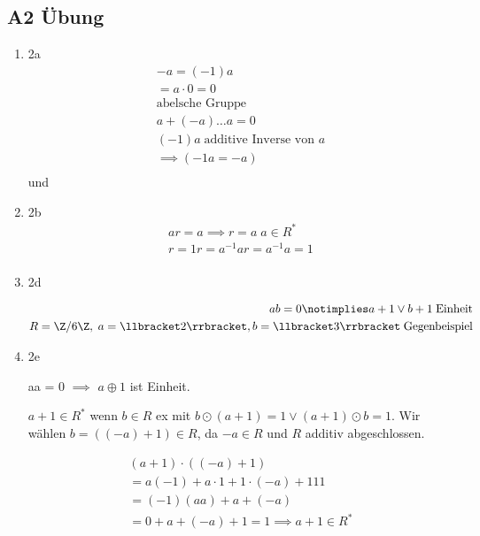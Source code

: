\subsection*{A2 Übung}

\begin{enumerate}
  \item 2a
    \begin{align*}
      -a = (-1)a \\
      = a\cdot 0 = 0\\
      \text{abelsche Gruppe} \\
      a + (-a) \ldots a = 0 \\
      (-1)a \; \text{additive Inverse von $a$}\\
      \implies (-1 a = -a) \\
    \end{align*}
    und

    \item 2b
    \begin{align*}
      ar = a \implies r = a \; a \in R^{*}\\
      r = 1 r = a^{-1}a r = a^{-1}a = 1\\
    \end{align*}

    \item 2d

    \begin{align*}
      ab = 0 \notimplies a+1 \lor b+1 \; \text{Einheit} \\
      R = \Z / 6 \Z, \; a = \dbr{2}, b = \dbr{3} \; \text{Gegenbeispiel}
    \end{align*}

    \item 2e

    aa = 0 $\implies$ $a \oplus 1$ ist Einheit.

    $a + 1 \in R^{*}$ wenn $b \in R$ ex mit $b \odot (a+1) = 1 \lor (a+1)\odot b = 1 $. Wir wählen $b = ((-a) + 1) \in R$, da $-a \in R$ und $R$ additiv abgeschlossen.

    \begin{align*}
      (a+1)\cdot ((-a) + 1) \\
      = a (-1) + a \cdot 1 + 1 \cdot ( -a) + 1 1 1 \\
      = (-1) (aa) + a + (-a) \\
      = 0 + a + (-a) + 1 = 1 \implies a + 1 \in R^{*}\\
    \end{align*}


\end{enumerate}


